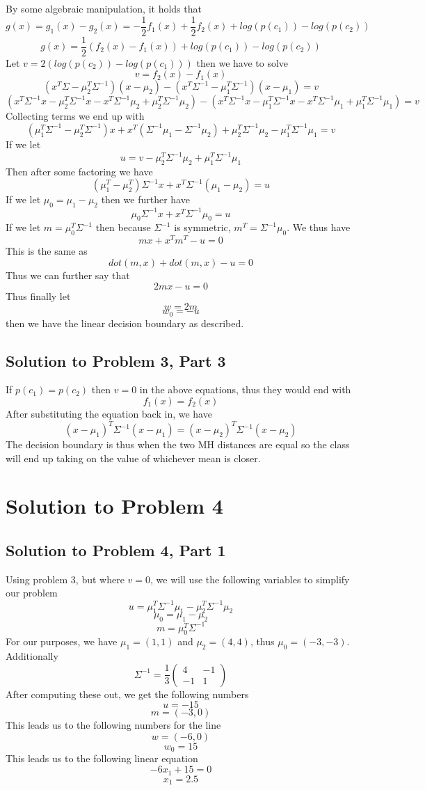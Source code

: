 \documentclass[11pt,psfig]{article}
\begin{document}
By some algebraic manipulation, it holds that
\[
g(x) = g_1(x)-g_2(x) = - \frac{1}{2} f_1(x) + \frac{1}{2} f_2(x) + log(p(c_1)) - log(p(c_2))
\]
\[
g(x) = \frac{1}{2} ( f_2(x) - f_1(x) ) + log(p(c_1)) - log(p(c_2))
\]
Let $v = 2( log(p(c_2)) - log(p(c_1)) )$ then we have to solve
\[
v = f_2(x) - f_1(x)
\]
\[
(x^T \Sigma - \mu_2^T \Sigma^{-1})(x - \mu_2) - (x^T \Sigma^{-1} - \mu_1^T \Sigma^{-1})(x - \mu_1) = v
\]
\[
(x^T \Sigma^{-1} x - \mu_2^T \Sigma^{-1} x - x^T \Sigma^{-1} \mu_2 + \mu_2^T \Sigma^{-1} \mu_2) - (x^T \Sigma^{-1} x - \mu_1^T \Sigma^{-1} x - x^T \Sigma^{-1} \mu_1 + \mu_1^T \Sigma^{-1} \mu_1) = v
\]
Collecting terms we end up with
\[
(\mu_1^T \Sigma^{-1} - \mu_2^T \Sigma^{-1}) x + x^T (\Sigma^{-1} \mu_1 - \Sigma^{-1} \mu_2) + \mu_2^T \Sigma^{-1} \mu_2 - \mu_1^T \Sigma^{-1} \mu_1 = v
\]
If we let
\[
u = v - \mu_2^T \Sigma^{-1} \mu_2 + \mu_1^T \Sigma^{-1} \mu_1
\]
Then after some factoring we have
\[
(\mu_1^T - \mu_2^T) \Sigma^{-1} x + x^T \Sigma^{-1} (\mu_1 - \mu_2) = u
\]
If we let $\mu_0 = \mu_1 - \mu_2$ then we further have
\[
\mu_0 \Sigma^{-1} x + x^T \Sigma^{-1} \mu_0 = u
\]
If we let $m = \mu_0^T \Sigma^{-1}$ then because $\Sigma^{-1}$ is symmetric, $m^T = \Sigma^{-1} \mu_0$. We thus have
\[
m x + x^T m^T - u = 0
\]
This is the same as
\[
dot(m,x) + dot(m,x) - u = 0
\]
Thus we can further say that
\[
2mx - u = 0
\]
Thus finally let
\[
w = 2m
\]
\[
w_0 = -u
\]
then we have the linear decision boundary as described.

\subsection*{Solution to Problem 3, Part 3}

If $p(c_1) = p(c_2)$ then $v=0$ in the above equations, thus they would end with
\[
f_1(x) = f_2(x)
\]
After substituting the equation back in, we have
\[
(x-\mu_1)^T \Sigma^{-1} (x-\mu_1) = (x-\mu_2)^T \Sigma^{-1} (x-\mu_2)
\]
The decision boundary is thus when the two MH distances are equal so the class will end up taking on the value of whichever mean is closer. 
\newpage
\section*{Solution to Problem 4}
\subsection*{Solution to Problem 4, Part 1}

Using problem 3, but where $v=0$, we will use the following variables to simplify our problem
\[
u = \mu_1^T \Sigma^{-1} \mu_1 - \mu_2^T \Sigma^{-1} \mu_2 
\]
\[
\mu_0 = \mu_1 - \mu_2
\]
\[
m = \mu_0^T \Sigma^{-1}
\]
For our purposes, we have $\mu_1=(1,1)$ and $\mu_2=(4,4)$, thus $\mu_0=(-3,-3)$. Additionally
\[
\Sigma^{-1} = \frac{1}{3} \left( \begin{array}{ccc}
4 & -1 \\
-1 & 1 \end{array} \right)
\]
After computing these out, we get the following numbers
\[
u = -15
\]
\[
m = (-3,0)
\]
This leads us to the following numbers for the line
\[
w = (-6, 0)
\]
\[
w_0 = 15
\]
This leads us to the following linear equation
\[
-6 x_1 + 15 = 0
\]
\[
x_1 = 2.5
\]
\end{document}
